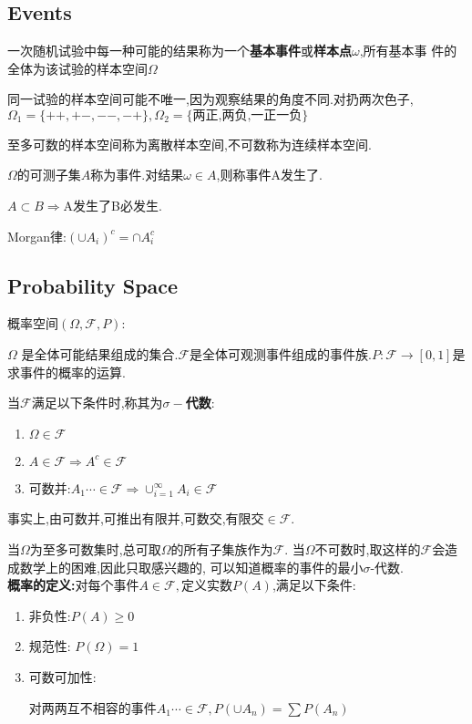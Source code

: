 
\section{}
\subsection{Events}
一次随机试验中每一种可能的结果称为一个{\bf 基本事件}或{\bf 样本点$ \omega$},所有基本事
件的全体为该试验的样本空间$ \Omega$

同一试验的样本空间可能不唯一,因为观察结果的角度不同.对扔两次色子,$ \Omega_1 =
\{++,+-,--,-+\}, \Omega_2 = \{\texttt{两正,两负,一正一负}\}$

至多可数的样本空间称为离散样本空间,不可数称为连续样本空间.

$ \Omega$的可测子集$ A$称为事件.对结果$ \omega \in A$,则称事件A发生了.

$ A \subset B \Rightarrow $A发生了B必发生.

Morgan律:$ (\cup A_i)^c = \cap A_i^c$

\subsection{Probability Space}

概率空间$ (\Omega, \mathcal{F}, P)$:

$\Omega$ 是全体可能结果组成的集合.$ \mathcal{F}$是全体可观测事件组成的事件族.$ P:\mathcal{F} \rightarrow [0,1]$是求事件的概率的运算.

当$ \mathcal{F}$满足以下条件时,称其为{\bf $ \sigma -$代数}:
\begin{enumerate}
	\item $ \Omega \in \mathcal{F}$
	\item $ A\in \mathcal{F} \Rightarrow A^c \in \mathcal{F}$
	\item 可数并:$ A_1 \cdots \in \mathcal{F} \Rightarrow  \cup_{i = 1}^{\infty}{A_i}
		\in \mathcal{F}$
\end{enumerate}
事实上,由可数并,可推出有限并,可数交,有限交$ \in \mathcal{F}$.

当$ \Omega$为至多可数集时,总可取$ \Omega$的所有子集族作为$ \mathcal{F}$.
当$ \Omega$不可数时,取这样的$ \mathcal{F}$会造成数学上的困难,因此只取感兴趣的,
可以知道概率的事件的最小$ \sigma$-代数.
\\

{\bf 概率的定义:}对每个事件$ A\in \mathcal{F},$定义实数$ P(A)$,满足以下条件:
\begin{enumerate}
	\item 非负性:$ P(A) \ge 0$
	\item 规范性: $ P(\Omega) = 1$
	\item 可数可加性:

		对两两互不相容的事件$ A_1 \cdots \in \mathcal{F}, P(\cup{A_n}) =
		\sum{P(A_n)}$
\end{enumerate}

